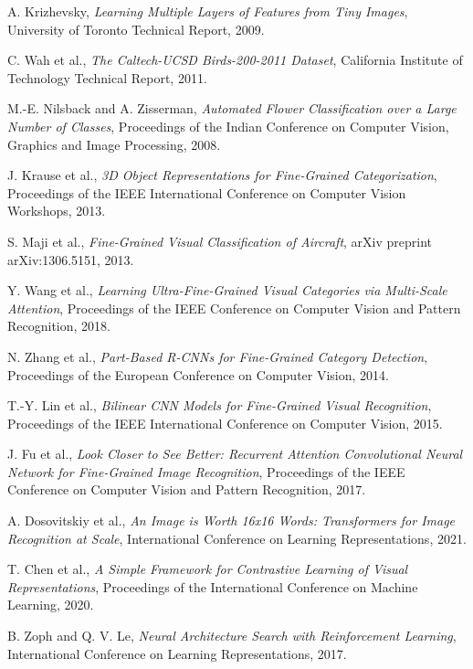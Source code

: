 \documentclass[12pt]{article}
\begin{document}
\begin{thebibliography}{99}
A. Krizhevsky,
\textit{Learning Multiple Layers of Features from Tiny Images},
University of Toronto Technical Report, 2009.

C. Wah et al.,
\textit{The Caltech-UCSD Birds-200-2011 Dataset},
California Institute of Technology Technical Report, 2011.

M.-E. Nilsback and A. Zisserman,
\textit{Automated Flower Classification over a Large Number of Classes},
Proceedings of the Indian Conference on Computer Vision, Graphics and Image Processing, 2008.

J. Krause et al.,
\textit{3D Object Representations for Fine-Grained Categorization},
Proceedings of the IEEE International Conference on Computer Vision Workshops, 2013.

S. Maji et al.,
\textit{Fine-Grained Visual Classification of Aircraft},
arXiv preprint arXiv:1306.5151, 2013.

Y. Wang et al.,
\textit{Learning Ultra-Fine-Grained Visual Categories via Multi-Scale Attention},
Proceedings of the IEEE Conference on Computer Vision and Pattern Recognition, 2018.

N. Zhang et al.,
\textit{Part-Based R-CNNs for Fine-Grained Category Detection},
Proceedings of the European Conference on Computer Vision, 2014.

T.-Y. Lin et al.,
\textit{Bilinear CNN Models for Fine-Grained Visual Recognition},
Proceedings of the IEEE International Conference on Computer Vision, 2015.

J. Fu et al.,
\textit{Look Closer to See Better: Recurrent Attention Convolutional Neural Network for Fine-Grained Image Recognition},
Proceedings of the IEEE Conference on Computer Vision and Pattern Recognition, 2017.

A. Dosovitskiy et al.,
\textit{An Image is Worth 16x16 Words: Transformers for Image Recognition at Scale},
International Conference on Learning Representations, 2021.

T. Chen et al.,
\textit{A Simple Framework for Contrastive Learning of Visual Representations},
Proceedings of the International Conference on Machine Learning, 2020.

B. Zoph and Q. V. Le,
\textit{Neural Architecture Search with Reinforcement Learning},
International Conference on Learning Representations, 2017.


\end{thebibliography}
\end{document}
